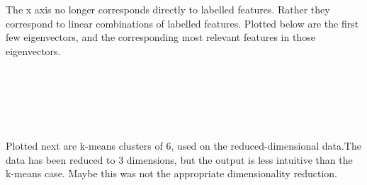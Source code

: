 \documentclass{article} %
\begin{document}
The x axis no longer corresponds directly to labelled features. Rather they correspond to linear combinations of labelled features. Plotted below are the first few eigenvectors, and the corresponding most relevant features in those eigenvectors.

    \begin{center}
    \end{center}
    { \hspace*{\fill} \\}

    \begin{center}
    \end{center}
    { \hspace*{\fill} \\}

    \begin{center}
    \end{center}
    { \hspace*{\fill} \\}

Plotted next are k-means clusters of 6, used on the reduced-dimensional data.The data has been reduced to 3 dimensions, but the output is less intuitive than the k-means case. Maybe this was not the appropriate dimensionality reduction.

    \begin{center}
    \end{center}
    { \hspace*{\fill} \\}


    \begin{center}
    \end{center}
    { \hspace*{\fill} \\}

   \begin{center}
    \end{center}
    { \hspace*{\fill} \\}
\end{document}
